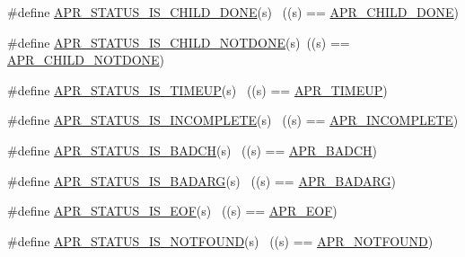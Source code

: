 \begin{DoxyCompactItemize}
\item 
\#define \hyperlink{group___a_p_r___s_t_a_t_u_s___i_s_gaa756a35c5bce65fdeecaa34ac600c58b}{A\+P\+R\+\_\+\+S\+T\+A\+T\+U\+S\+\_\+\+I\+S\+\_\+\+C\+H\+I\+L\+D\+\_\+\+D\+O\+NE}(s)      ~((s) == \hyperlink{group___a_p_r___error_ga2a78375cab66b8c1a4e06329e0cfcaf4}{A\+P\+R\+\_\+\+C\+H\+I\+L\+D\+\_\+\+D\+O\+NE})
\item 
\#define \hyperlink{group___a_p_r___s_t_a_t_u_s___i_s_ga86190a4a2c04bbbbedc2491bb93ab432}{A\+P\+R\+\_\+\+S\+T\+A\+T\+U\+S\+\_\+\+I\+S\+\_\+\+C\+H\+I\+L\+D\+\_\+\+N\+O\+T\+D\+O\+NE}(s)~((s) == \hyperlink{group___a_p_r___error_ga00bba31c29774cce3e72a31f88610340}{A\+P\+R\+\_\+\+C\+H\+I\+L\+D\+\_\+\+N\+O\+T\+D\+O\+NE})
\item 
\#define \hyperlink{group___a_p_r___s_t_a_t_u_s___i_s_gaa49ad314454d0d03722ebe8955c40395}{A\+P\+R\+\_\+\+S\+T\+A\+T\+U\+S\+\_\+\+I\+S\+\_\+\+T\+I\+M\+E\+UP}(s)              ~((s) == \hyperlink{group___a_p_r___error_ga9ac087c25ffb0d3bb4d75bee36709853}{A\+P\+R\+\_\+\+T\+I\+M\+E\+UP})
\item 
\#define \hyperlink{group___a_p_r___s_t_a_t_u_s___i_s_ga3924108de51167fb450cf906779a79c5}{A\+P\+R\+\_\+\+S\+T\+A\+T\+U\+S\+\_\+\+I\+S\+\_\+\+I\+N\+C\+O\+M\+P\+L\+E\+TE}(s)      ~((s) == \hyperlink{group___a_p_r___error_ga64dff43b83bcefd3f3c751be6b864ca1}{A\+P\+R\+\_\+\+I\+N\+C\+O\+M\+P\+L\+E\+TE})
\item 
\#define \hyperlink{group___a_p_r___s_t_a_t_u_s___i_s_ga159d2c1c1a9c43ef44b09a6f96967a73}{A\+P\+R\+\_\+\+S\+T\+A\+T\+U\+S\+\_\+\+I\+S\+\_\+\+B\+A\+D\+CH}(s)                ~((s) == \hyperlink{group___a_p_r___error_ga6f3ca71069880d9fe5678687a257d616}{A\+P\+R\+\_\+\+B\+A\+D\+CH})
\item 
\#define \hyperlink{group___a_p_r___s_t_a_t_u_s___i_s_gaf784c37a602fdc328436ecda79110f43}{A\+P\+R\+\_\+\+S\+T\+A\+T\+U\+S\+\_\+\+I\+S\+\_\+\+B\+A\+D\+A\+RG}(s)              ~((s) == \hyperlink{group___a_p_r___error_ga771bf48ab38d93355be8530f6efe4ae9}{A\+P\+R\+\_\+\+B\+A\+D\+A\+RG})
\item 
\#define \hyperlink{group___a_p_r___s_t_a_t_u_s___i_s_gafe2694daa9a7a2bbc6131f0c86216170}{A\+P\+R\+\_\+\+S\+T\+A\+T\+U\+S\+\_\+\+I\+S\+\_\+\+E\+OF}(s)                    ~((s) == \hyperlink{group___a_p_r___error_ga35d9dca2514c522a2840aca0f3e2ebd3}{A\+P\+R\+\_\+\+E\+OF})
\item 
\#define \hyperlink{group___a_p_r___s_t_a_t_u_s___i_s_ga0e6bd21f26cdce4ab23618816a1b6def}{A\+P\+R\+\_\+\+S\+T\+A\+T\+U\+S\+\_\+\+I\+S\+\_\+\+N\+O\+T\+F\+O\+U\+ND}(s)          ~((s) == \hyperlink{group___a_p_r___error_ga9bd83273ff02f31f71fb4dc6f29df4a9}{A\+P\+R\+\_\+\+N\+O\+T\+F\+O\+U\+ND})

\end{DoxyCompactItemize}
